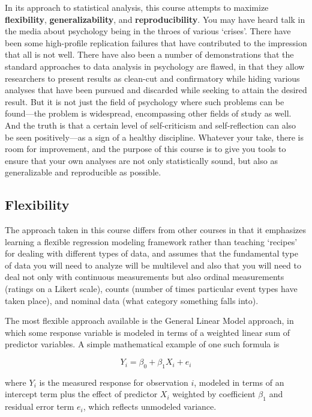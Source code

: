 \documentclass[]{book}
\begin{document}
In its approach to statistical analysis, this course attempts to maximize \textbf{flexibility}, \textbf{generalizability}, and \textbf{reproducibility}. You may have heard talk in the media about psychology being in the throes of various `crises'. There have been some high-profile replication failures that have contributed to the impression that all is not well. There have also been a number of demonstrations that the standard approaches to data analysis in psychology are flawed, in that they allow researchers to present results as clean-cut and confirmatory while hiding various analyses that have been pursued and discarded while seeking to attain the desired result. But it is not just the field of psychology where such problems can be found---the problem is widespread, encompassing other fields of study as well. And the truth is that a certain level of self-criticism and self-reflection can also be seen positively---as a sign of a healthy discipline. Whatever your take, there is room for improvement, and the purpose of this course is to give you tools to ensure that your own analyses are not only statistically sound, but also as generalizable and reproducible as possible.

\hypertarget{flexibility}{%
\subsection{Flexibility}\label{flexibility}}

The approach taken in this course differs from other courses in that it emphasizes learning a flexible regression modeling framework rather than teaching `recipes' for dealing with different types of data, and assumes that the fundamental type of data you will need to analyze will be multilevel and also that you will need to deal not only with continuous measurements but also ordinal measurements (ratings on a Likert scale), counts (number of times particular event types have taken place), and nominal data (what category something falls into).

The most flexible approach available is the General Linear Model approach, in which some response variable is modeled in terms of a weighted linear sum of predictor variables. A simple mathematical example of one such formula is

\[Y_i = \beta_0 + \beta_1 X_i + e_i\]

where \(Y_i\) is the measured response for observation \(i\), modeled in terms of an intercept term plus the effect of predictor \(X_i\) weighted by coefficient \(\beta_1\) and residual error term \(e_i\), which reflects unmodeled variance.
\end{document}
